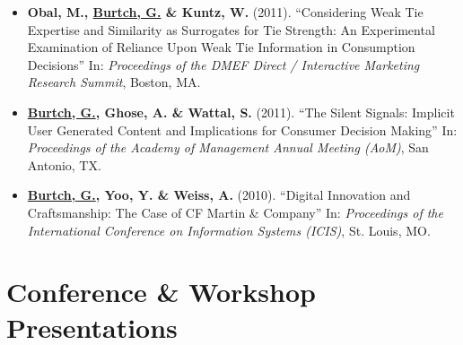 \documentclass[10.5pt,letterpaper,sans]{moderncv}        %
\begin{document}
\begin{itemize}
\item \textbf{Obal, M., \underline{Burtch, G.} \& Kuntz, W.} (2011). ``Considering Weak Tie Expertise and Similarity as Surrogates for Tie Strength: An Experimental Examination of Reliance Upon Weak Tie Information in Consumption Decisions'' In: \textit{Proceedings of the DMEF Direct / Interactive Marketing Research Summit}, Boston, MA.

\item \textbf{\underline{Burtch, G.}, Ghose, A. \& Wattal, S.} (2011). ``The Silent Signals: Implicit User Generated Content and Implications for Consumer Decision Making'' In: \textit{Proceedings of the Academy of Management Annual Meeting (AoM)}, San Antonio, TX.

\item \textbf{\underline{Burtch, G.}, Yoo, Y. \& Weiss, A.} (2010). ``Digital Innovation and Craftsmanship: The Case of CF Martin \& Company'' In: \textit{Proceedings of the International Conference on Information Systems (ICIS)}, St. Louis, MO.

\end{itemize}

 
\section{Conference \& Workshop Presentations}
\end{document}
